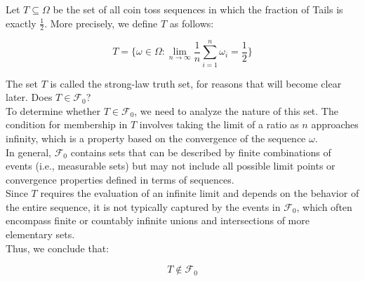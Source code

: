 \begin{example}
    Let \( T \subseteq \Omega \) be the set of all coin toss sequences in which the fraction of Tails is exactly \( \frac{1}{2} \). More precisely, we define \( T \) as follows:

\[
T = \{ \omega \in \Omega : \lim_{n \to \infty} \frac{1}{n} \sum_{i=1}^{n} \omega_i = \frac{1}{2} \}
\]

The set \( T \) is called the strong-law truth set, for reasons that will become clear later. Does \( T \in \mathcal{F}_0 \)?\\

To determine whether \( T \in \mathcal{F}_0 \), we need to analyze the nature of this set. The condition for membership in \( T \) involves taking the limit of a ratio as \( n \) approaches infinity, which is a property based on the convergence of the sequence \( \omega \). \\

In general, \( \mathcal{F}_0 \) contains sets that can be described by finite combinations of events (i.e., measurable sets) but may not include all possible limit points or convergence properties defined in terms of sequences. \\

Since \( T \) requires the evaluation of an infinite limit and depends on the behavior of the entire sequence, it is not typically captured by the events in \( \mathcal{F}_0 \), which often encompass finite or countably infinite unions and intersections of more elementary sets.\\

Thus, we conclude that:

\[
T \notin \mathcal{F}_0
\]

\end{example}

